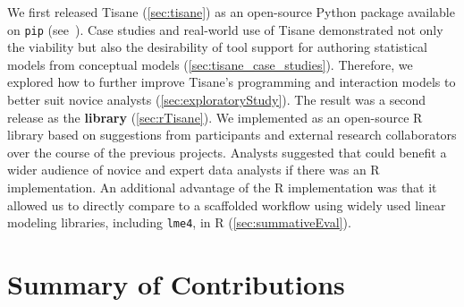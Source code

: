 We first released Tisane (\autoref{sec:tisane}) as an open-source Python package
available on \texttt{pip} (see~\cite{tisaneWebsite}). Case studies and
real-world use of Tisane demonstrated not only the viability but also the
desirability of tool support for authoring statistical models from conceptual
models (\autoref{sec:tisane_case_studies}). Therefore, we explored how to
further improve Tisane's programming and interaction models to better suit
novice analysts (\autoref{sec:exploratoryStudy}). The result was a second
release as the \textbf{\rTisane library} \cite{jun2023rTisane}
(\autoref{sec:rTisane}). We implemented \rTisane as an open-source R library
based on suggestions from participants and external research collaborators over
the course of the previous projects. Analysts suggested that \tisane could
benefit a wider audience of novice and expert data analysts if there was an R
implementation.
An additional advantage of the R implementation was that it allowed us to directly
compare \rTisane to a scaffolded workflow using widely used linear modeling
libraries, including \texttt{lme4}, in R (\autoref{sec:summativeEval}). 







\section{Summary of Contributions}


